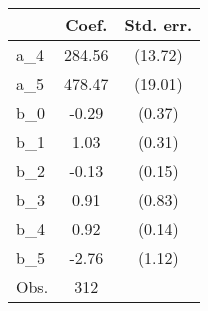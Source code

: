 {
\def\sym#1{\ifmmode^{#1}\else\(^{#1}\)\fi}
\begin{tabular}{l*{1}{cc}}
\hline\hline
                &    Coef.&Std. err.\\
\hline
a\_4             &   284.56&  (13.72)\\
a\_5             &   478.47&  (19.01)\\
b\_0             &    -0.29&   (0.37)\\
b\_1             &     1.03&   (0.31)\\
b\_2             &    -0.13&   (0.15)\\
b\_3             &     0.91&   (0.83)\\
b\_4             &     0.92&   (0.14)\\
b\_5             &    -2.76&   (1.12)\\
\hline
Obs.            &      312&         \\
\hline\hline
\end{tabular}
}
